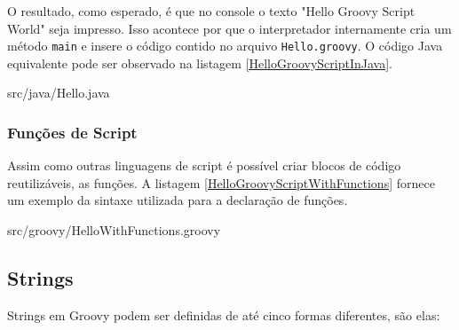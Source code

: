 \documentclass[12pt]{article}
\begin{document}
    O resultado, como esperado, é que no console o texto "Hello Groovy Script World"
    seja impresso. Isso acontece por que o interpretador internamente cria um 
    método \texttt{main} e insere o código contido no arquivo \texttt{Hello.groovy}.
    O código Java equivalente pode ser observado na listagem \ref{HelloGroovyScriptInJava}.
    
    
                    {src/java/Hello.java}

\subsubsection{Funções de Script}

    Assim como outras linguagens de script é possível criar blocos de código 
    reutilizáveis, as funções. A listagem \ref{HelloGroovyScriptWithFunctions} 
    fornece um exemplo da sintaxe utilizada para a declaração de funções.
    
    
                    {src/groovy/HelloWithFunctions.groovy}
   

\subsection{Strings}

    Strings em Groovy podem ser definidas de até cinco formas diferentes, são elas:
    
\end{document}
